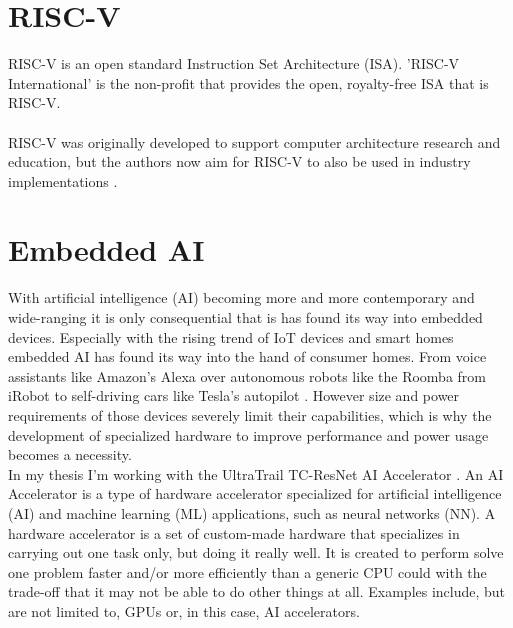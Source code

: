 

\section{RISC-V}

RISC-V \cite{riscv} is an open standard Instruction Set Architecture (ISA).
'RISC-V International' is the non-profit that provides the open, royalty-free ISA that is RISC-V.
\\\\
RISC-V was originally developed to support computer architecture research and education, but the authors now
aim for RISC-V to also be used in industry implementations \cite{riscv_spec}.

\section{Embedded AI}

With artificial intelligence (AI) becoming more and more contemporary and wide-ranging it is only consequential that is has found its way into embedded devices.
Especially with the  rising trend of IoT devices and smart homes
embedded AI has found its way into the hand of consumer homes.
From voice assistants like Amazon's Alexa \cite{alexa} over autonomous robots like the Roomba \cite{roomba} from iRobot to self-driving cars like Tesla's autopilot \cite{autopilot}.
However size and power requirements of those devices severely limit their capabilities, which is why the development of specialized hardware to improve performance
and power usage becomes a necessity.\\

In my thesis I'm working with the UltraTrail TC-ResNet AI Accelerator \cite{ultratrail}.
An AI Accelerator is a type of hardware accelerator specialized for artificial intelligence (AI) and machine learning (ML) applications, such as neural networks (NN).
A hardware accelerator is a set of custom-made hardware that specializes in carrying out one task only, but doing it really well.
It is created to perform solve one problem faster and/or more efficiently than a generic CPU could with the trade-off that it may not be able to do other things at all.
Examples include, but are not limited to, GPUs or, in this case, AI accelerators.\\\\


